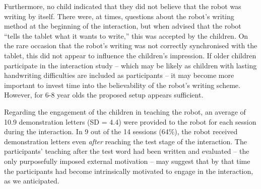 \documentclass{sig-alternate}
\begin{document}
Furthermore, no child indicated that they did not believe that the robot was
writing by itself. There were, at times, questions about the robot's writing
method at the beginning of the interaction, but when advised that the robot
``tells the tablet what it wants to write,'' this was accepted by the children. 
On the rare occasion that the robot's writing was not correctly synchronised
with the tablet, this did not appear to influence the children's impression.
If older children participate in the interaction study -- which may be
likely as children with lasting handwriting difficulties are included as
participants -- it may become more important to invest time into the
believability of the robot's writing scheme. However, for 6-8 year olds the
proposed setup appears sufficient.

Regarding the engagement of the children in teaching the robot, an average of
10.9 demonstration letters (SD = 4.4) were provided to the robot for each
session during the interaction.  In 9 out of the 14 sessions (64\%), the robot
received demonstration letters even \emph{after} reaching the test stage of the
interaction. The participants' teaching after the test word had been written and
evaluated -- the only purposefully imposed external motivation -- may suggest
that by that time the participants had become intrinsically motivated to engage
in the interaction, as we anticipated.


\end{document}

